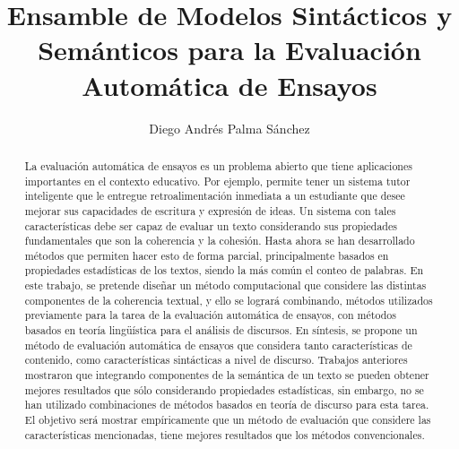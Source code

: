 \documentclass[12pt]{diicc}
\title{\bf Ensamble de Modelos Sintácticos y Semánticos para la Evaluación
Automática de Ensayos}
\author{Diego Andrés Palma Sánchez}
\begin{document}
\frontmatter

%


%
\begin{abstract}
La evaluación automática de ensayos es un problema abierto que tiene aplicaciones importantes en el contexto educativo. Por ejemplo, permite tener un sistema tutor inteligente que le entregue retroalimentación inmediata a un estudiante que desee mejorar sus capacidades de escritura y expresión de ideas. Un sistema con tales características debe ser capaz de evaluar un texto considerando sus propiedades fundamentales que son la coherencia y la cohesión. Hasta ahora se han desarrollado métodos que permiten hacer esto de forma parcial, principalmente basados en propiedades estadísticas de los textos, siendo la más común el conteo de palabras. En este trabajo, se pretende diseñar un método computacional que considere las distintas componentes de la coherencia textual, y ello se logrará combinando, métodos utilizados previamente para la tarea de la evaluación automática de ensayos, con métodos basados en teoría lingüística para el análisis de discursos. En síntesis, se propone un método de evaluación automática de ensayos que considera tanto características de contenido, como características sintácticas a nivel de discurso. Trabajos anteriores mostraron que integrando componentes de la semántica de un texto se pueden obtener mejores resultados que sólo considerando propiedades estadísticas, sin embargo, no se han utilizado combinaciones de métodos basados en teoría de discurso para esta tarea. El objetivo será mostrar empíricamente que un método de evaluación que considere las características mencionadas, tiene mejores resultados que los métodos convencionales.
\end{abstract}
\end{document}
